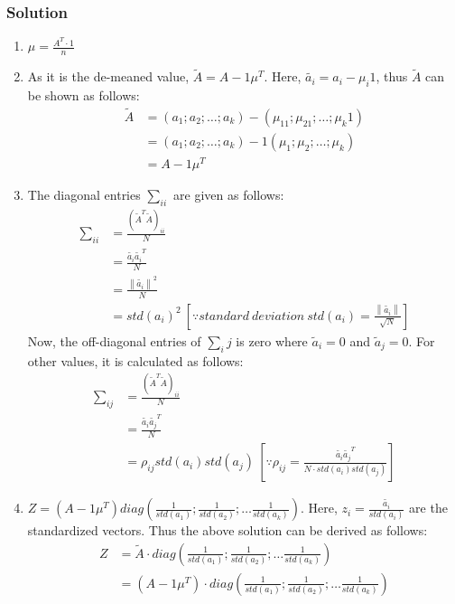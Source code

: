 \documentclass{article}
\newcommand{\norm}[1]{\left\lVert#1\right\rVert}
\begin{document}
\subsubsection*{Solution}
\begin{enumerate}[label=(\alph*)]
    \item $\mu=\frac{A^T\cdot1}{n}$
    \item As it is the de-meaned value, $\widetilde{A} = A-1\mu^T$.
    Here, $\widetilde{a_i} = a_i-\mu_i1$, thus $\widetilde{A}$ can be shown as follows:
    \begin{align*}
        \widetilde{A} & = (a_1; a_2; \ldots; a_k) - (\mu_11; \mu_21; \ldots; \mu_k1)\\
        & = (a_1; a_2; \ldots; a_k) - 1(\mu_1; \mu_2; \ldots; \mu_k)\\
        & = A-1\mu^T
    \end{align*}
    \item The diagonal entries $\sum_{ii}$ are given as follows:
    \begin{align*}
        \sum_{ii} & = \frac{(\widetilde{A}^T\widetilde{A})_{ii}}{N}\\
        & = \frac{\widetilde{a_i}\widetilde{a_i}^T}{N}\\
        & = \frac{\norm{\widetilde{a_i}}^2}{N}\\
        & = std(a_i)^2\ [\because standard\ deviation\ std(a_i)=\frac{\norm{\widetilde{a_i}}}{\sqrt{N}}]
    \end{align*}
    Now, the off-diagonal entries of $\sum_ij$ is zero where $\widetilde{a}_i=0$ and $\widetilde{a}_j=0$. For other values, it is calculated as follows:
    \begin{align*}
        \sum_{ij} & =  \frac{(\widetilde{A}^T\widetilde{A})_{ii}}{N}\\
        & = \frac{\widetilde{a_i}\widetilde{a_j}^T}{N}\\
        & = \rho_{ij}std(a_i)std(a_j)\ \left[\because \rho_{ij} = \frac{\widetilde{a_i}\widetilde{a_j}^T}{N\cdot std(a_i)std(a_j)}\right]
    \end{align*}
    \item $Z = (A-1\mu^T)diag(\frac{1}{std(a_1)};\frac{1}{std(a_2)};\ldots\frac{1}{std(a_k)})$. Here, $z_i = \frac{\widetilde{a_i}}{std(a_i)}$ are the standardized vectors. Thus the above solution can be derived as follows:
    \begin{align*}
        Z & = \widetilde{A}\cdot diag(\frac{1}{std(a_1)};\frac{1}{std(a_2)};\ldots\frac{1}{std(a_k)})\\
        & = (A-1\mu^T)\cdot diag(\frac{1}{std(a_1)};\frac{1}{std(a_2)};\ldots\frac{1}{std(a_k)})
    \end{align*}
    
\end{enumerate}
\end{document}
